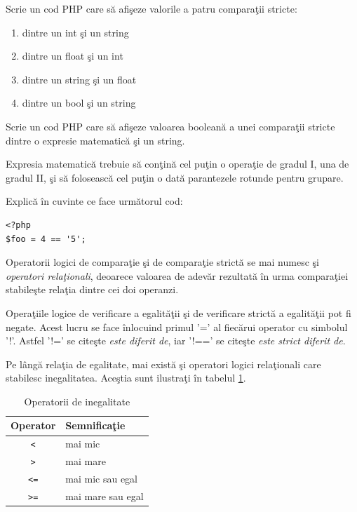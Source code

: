 \begin{Exercise}[title={Verifică-ţi puterea de a face analogii},difficulty=1]
Scrie un cod PHP care să afişeze valorile a patru comparaţii stricte:
\begin{enumerate}
	\item dintre un int şi un string
	\item dintre un float şi un int
	\item dintre un string şi un float
	\item dintre un bool şi un string
\end{enumerate}
\end{Exercise}

\begin{Exercise}[title={Am sintetizat corect noţiunea de \textit{expresie}?},difficulty=2]
\ExePart
Scrie un cod PHP care să afişeze valoarea booleană a unei comparaţii
stricte dintre o expresie matematică şi un string.

Expresia matematică trebuie să conţină cel puţin o operaţie de gradul I, una
de gradul II, şi să folosească cel puţin o dată parantezele rotunde pentru
grupare.
\ExePart

Explică în cuvinte ce face următorul cod:

\begin{lstlisting}
<?php
$foo = 4 == '5';
\end{lstlisting}
\end{Exercise}

Operatorii logici de comparaţie şi de comparaţie strictă se mai numesc
şi \textsl{operatori relaţionali}, deoarece valoarea de adevăr rezultată
în urma comparaţiei stabileşte relaţia dintre cei doi operanzi.

Operaţiile logice de verificare a egalităţii şi de verificare strictă
a egalităţii pot fi negate. Acest lucru se face înlocuind primul '='
al fiecărui operator cu simbolul '!'. Astfel '!=' se citeşte \textit{este diferit de},
iar '!==' se citeşte \textit{este strict diferit de}.

Pe lângă relaţia de egalitate, mai există şi operatori logici relaţionali
care stabilesc inegalitatea. Aceştia sunt ilustraţi în
tabelul \ref{tbl:operatori inegalitate}.

\begin{table}[h!]
  \begin{center}
  	  \begin{tabular}{| c | l |}
	  \hline
	  Operator & Semnificaţie \\
	  \hline
	  \texttt{<}	& mai mic \\
	  \texttt{>}	& mai mare \\
	  \texttt{<=}	& mai mic sau egal \\
	  \texttt{>=}	& mai mare sau egal \\
	  \hline
	  \end{tabular}
  \end{center}
  \caption{Operatorii de inegalitate}
  \label{tbl:operatori inegalitate}
\end{table}


